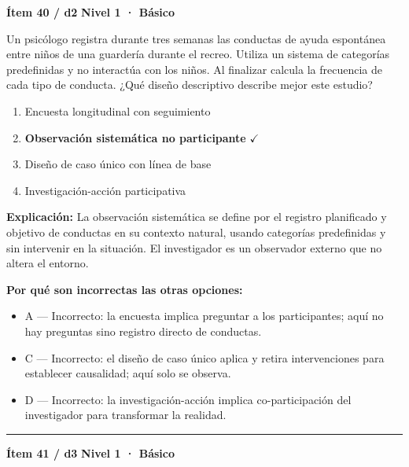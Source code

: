 \documentclass[12pt,a4paper]{article}
\begin{document}
\begin{mdframed}[backgroundcolor=fondogris,linecolor=azul,linewidth=1pt,innerleftmargin=10pt,innerrightmargin=10pt,innertopmargin=7pt,innerbottommargin=7pt]
\textbf{Ítem 40 / d2} \hfill {\small\bfseries\color{azul} Nivel 1 · Básico}
\end{mdframed}

Un psicólogo registra durante tres semanas las conductas de ayuda espontánea entre niños de una guardería durante el recreo. Utiliza un sistema de categorías predefinidas y no interactúa con los niños. Al finalizar calcula la frecuencia de cada tipo de conducta. ¿Qué diseño descriptivo describe mejor este estudio?

\begin{enumerate}
  \item[A.] Encuesta longitudinal con seguimiento
  \item[\textbf{\color{verde}B.}] \textbf{\color{verde} Observación sistemática no participante} \hfill $\checkmark$
  \item[C.] Diseño de caso único con línea de base
  \item[D.] Investigación-acción participativa
\end{enumerate}

\noindent\textbf{\color{azul}Explicación:} La observación sistemática se define por el registro planificado y objetivo de conductas en su contexto natural, usando categorías predefinidas y sin intervenir en la situación. El investigador es un observador externo que no altera el entorno.

\noindent\textbf{\color{gris}Por qué son incorrectas las otras opciones:}
\begin{itemize}
  \item {\small A — Incorrecto: la encuesta implica preguntar a los participantes; aquí no hay preguntas sino registro directo de conductas.}
  \item {\small C — Incorrecto: el diseño de caso único aplica y retira intervenciones para establecer causalidad; aquí solo se observa.}
  \item {\small D — Incorrecto: la investigación-acción implica co-participación del investigador para transformar la realidad.}
\end{itemize}
\vspace{8pt}\hrule\vspace{10pt}

\begin{mdframed}[backgroundcolor=fondogris,linecolor=azul,linewidth=1pt,innerleftmargin=10pt,innerrightmargin=10pt,innertopmargin=7pt,innerbottommargin=7pt]
\textbf{Ítem 41 / d3} \hfill {\small\bfseries\color{azul} Nivel 1 · Básico}
\end{mdframed}
\end{document}
